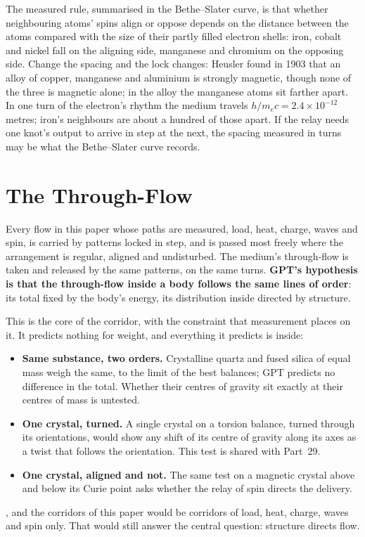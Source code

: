 \documentclass[11pt,a4paper]{article}
\begin{document}
 The measured rule, summarised in the Bethe--Slater curve, is that whether neighbouring atoms' spins align or oppose depends on the distance between the atoms compared with the size of their partly filled electron shells: iron, cobalt and nickel fall on the aligning side, manganese and chromium on the opposing side. Change the spacing and the lock changes: Heusler found in 1903 that an alloy of copper, manganese and aluminium is strongly magnetic, though none of the three is magnetic alone; in the alloy the manganese atoms sit farther apart.  In one turn of the electron's rhythm the medium travels $h/m_ec = 2.4\times10^{-12}$ metres; iron's neighbours are about a hundred of those apart. If the relay needs one knot's output to arrive in step at the next, the spacing measured in turns may be what the Bethe--Slater curve records.

\section{The Through-Flow}
\label{sec:through}

\begin{hypbar}
Every flow in this paper whose paths are measured, load, heat, charge, waves and spin, is carried by patterns locked in step, and is passed most freely where the arrangement is regular, aligned and undisturbed. The medium's through-flow is taken and released by the same patterns, on the same turns. \textbf{GPT's hypothesis is that the through-flow inside a body follows the same lines of order}: its total fixed by the body's energy, its distribution inside directed by structure.
\end{hypbar}

This is the core of the corridor, with the constraint that measurement places on it. It predicts nothing for weight, and everything it predicts is inside:
\begin{itemize}
\item \textbf{Same substance, two orders.} Crystalline quartz and fused silica of equal mass weigh the same, to the limit of the best balances; GPT predicts no difference in the total. Whether their centres of gravity sit exactly at their centres of mass is untested.
\item \textbf{One crystal, turned.} A single crystal on a torsion balance, turned through its orientations, would show any shift of its centre of gravity along its axes as a twist that follows the orientation. This test is shared with Part~29.
\item \textbf{One crystal, aligned and not.} The same test on a magnetic crystal above and below its Curie point asks whether the relay of spin directs the delivery.
\end{itemize}
, and the corridors of this paper would be corridors of load, heat, charge, waves and spin only. That would still answer the central question: structure directs flow.
\end{document}
